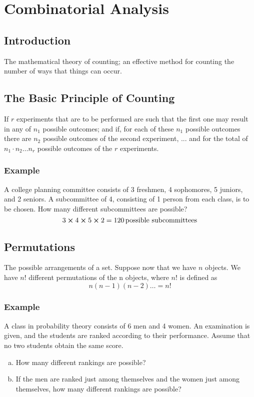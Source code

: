 \setcounter{chapter}{0}
\chapter{Combinatorial Analysis}

\section{Introduction}
\begin{definition}
The mathematical theory of counting; an effective method for counting the number of ways that things can occur.
\end{definition}

\section{The Basic Principle of Counting}
\begin{definition}
If $r$ experiments that are to be performed are such that the first one may result in any of $n_1$ possible outcomes; and if, for each of these $n_1$ possible outcomes there are $n_2$ possible outcomes of the second experiment, ... and for the total of $n_1\cdot n_2\ldots n_r$ possible outcomes of the $r$ experiments.
\end{definition}
\subsection*{Example}
A college planning committee consists of 3 freshmen, 4 sophomores, 5 juniors, and 2 seniors. A subcommittee of 4, consisting of 1 person from each class, is to be chosen. How many different subcommittees are possible?
\[3\cross 4\cross 5\cross 2 = 120\,\text{possible subcommittees}\]
\section{Permutations}
\begin{definition}[Permutations]
The possible arrangements of a set. Suppose now that we have $n$ objects. We have $n!$ different permutations of the n objects, where $n!$ is defined as
\[n(n-1)(n-2)\ldots = n!\]
\end{definition}
\subsection*{Example}
A class in probability theory consists of 6 men and 4 women. An examination is given, and the students are ranked according to their performance. Assume that no two students obtain the same score.
\begin{enumerate}[a. ]
    \item How many different rankings are possible?
    \item If the men are ranked just among themselves and the women just among
themselves, how many different rankings are possible?
\end{enumerate}
